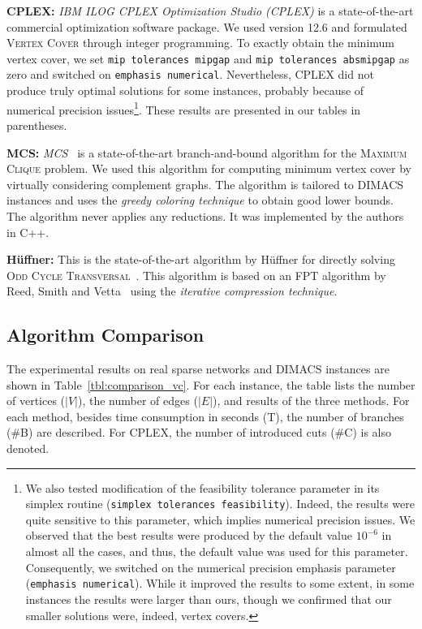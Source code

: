 \documentclass[11pt]{article}
\newcommand{\OCT}{\textsc{Odd Cycle Transversal}\xspace}
\newcommand{\abs}[1]{\left| #1 \right|}
\newcommand{\myparagraph}[1]{\vspace{1em}\noindent\textbf{#1:}}
\begin{document}
\myparagraph{CPLEX} \emph{IBM ILOG CPLEX Optimization Studio (CPLEX)} is a state-of-the-art commercial optimization software package.
We used version 12.6 and formulated \textsc{Vertex Cover} through integer programming.
To exactly obtain the minimum vertex cover,
we set \texttt{mip tolerances mipgap} and \texttt{mip tolerances absmipgap} as zero
and switched on \texttt{emphasis numerical}.
Nevertheless, CPLEX did not produce truly optimal solutions for some instances,
probably because of numerical precision issues\footnote{We also tested modification of the feasibility tolerance parameter in its simplex routine
(\texttt{simplex tolerances feasibility}).
Indeed, the results were quite sensitive to this parameter,
which implies numerical precision issues.
We observed that the best results were produced
by the default value $10^{-6}$ in almost all the cases,
and thus, the default value was used for this parameter.
Consequently, we switched on the numerical precision emphasis parameter (\texttt{emphasis numerical}).
While it improved the results to some extent,
in some instances the results were larger than ours,
though we confirmed that our smaller solutions were, indeed, vertex covers.}.
These results are presented in our tables in parentheses.

\myparagraph{MCS} \emph{MCS}~\cite{clique/mcs_walcom10} is a state-of-the-art branch-and-bound algorithm
for the \textsc{Maximum Clique} problem.
We used this algorithm for computing minimum vertex cover by virtually considering complement graphs.
The algorithm is tailored to DIMACS instances
and uses the \emph{greedy coloring technique} to obtain good lower bounds.
The algorithm never applies any reductions.
It was implemented by the authors in C++.

\myparagraph{H{\"u}ffner}
This is the state-of-the-art algorithm by H{\"u}ffner
for directly solving \OCT~\cite{oct/huffner09}.
This algorithm is based on an FPT algorithm by Reed, Smith and Vetta~\cite{oct/reed2004}
using the \emph{iterative compression technique}.




\subsection{Algorithm Comparison}
The experimental results on real sparse networks and DIMACS instances
are shown in Table~\ref{tbl:comparison_vc}.
For each instance,
the table lists the number of vertices ($\abs{V}$),
the number of edges ($\abs{E}$),
and results of the three methods.
For each method,
besides time consumption in seconds (T),
the number of branches (\#B) are described.
For CPLEX, the number of introduced cuts (\#C) is also denoted.
\end{document}

